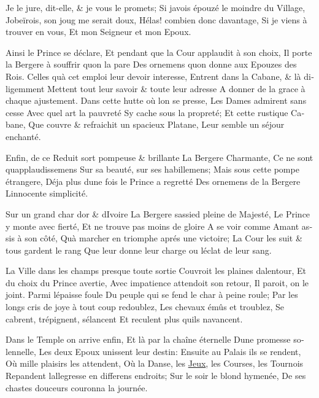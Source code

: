 \documentclass[14pt,a4paper]{memoir}
\newcommand{\ul}[1]{\uline{#1}}
\begin{document}
\begin{otherlanguage}{french}
{Je le jure, dit-elle, \& je vous le promets; } {Si
j\textquotesingle avois épouzé le moindre du Village,}
{J\textquotesingle obeïrois, son joug me serait doux,} {Hélas! combien
donc davantage,} {Si je viens à trouver en vous,} {Et mon Seigneur et
mon Epoux.}

{Ainsi le Prince se déclare,} {Et pendant que la Cour applaudit à son
choix,} {Il porte la Bergere à souffrir qu\textquotesingle on la pare}
{Des ornemens qu\textquotesingle on donne aux Epouzes des Rois.} {Celles
qu\textquotesingle à cet emploi leur devoir interesse,} {Entrent dans la
Cabane, \& là diligemment} {Mettent tout leur savoir \& toute leur
adresse } {A donner de la grace à chaque ajustement.} {Dans cette hutte
où l\textquotesingle on se presse,} {Les Dames admirent sans cesse}
{Avec quel art la pauvreté} {S\textquotesingle y cache sous la
propreté;} {Et cette rustique Cabane,} {Que couvre \& refraichit un
spacieux Platane, } {Leur semble un séjour enchanté.}

{Enfin, de ce Reduit sort pompeuse \& brillante } {La Bergere
Charmante,} {Ce ne sont qu\textquotesingle applaudissemens} {Sur sa
beauté, sur ses habillemens;} {Mais sous cette pompe étrangere,} {Déja
plus d\textquotesingle une fois le Prince a regretté} {Des ornemens de
la Bergere} {L\textquotesingle innocente simplicité.}

{Sur un grand char d\textquotesingle or \& d\textquotesingle Ivoire} {La
Bergere s\textquotesingle assied pleine de Majesté,} {Le Prince y monte
avec fierté,} {Et ne trouve pas moins de gloire} {A se voir comme Amant
assis à son côté,} {Qu\textquotesingle à marcher en triomphe aprés une
victoire;} {La Cour les suit \& tous gardent le rang} {Que leur donne
leur charge ou l\textquotesingle éclat de leur sang.}

{La Ville dans les champs presque toute sortie} {Couvroit les plaines
d\textquotesingle alentour,} {Et du choix du Prince avertie,} {Avec
impatience attendoit son retour,} {Il paroit, on le joint. Parmi
l\textquotesingle épaisse foule} {Du peuple qui se fend le char à peine
roule;} {Par les longs cris de joye à tout coup redoublez, } {Les
chevaux émûs et troublez,} {Se cabrent, trépignent,
s\textquotesingle élancent} {Et reculent plus qu\textquotesingle ils
n\textquotesingle avancent.}

{Dans le Temple on arrive enfin,} {Et là par la chaîne éternelle}
{D\textquotesingle une promesse solennelle,} {Les deux Epoux unissent
leur destin:} {Ensuite au Palais ils se rendent,} {Où mille plaisirs les
attendent,} {Où la Danse, les \ul{Jeux}, les Courses, les Tournois}
{Repandent l\textquotesingle allegresse en differens endroits;} {Sur le
soir le blond hymenée,} {De ses chastes douceurs couronna la journée.}


\end{otherlanguage}
\end{document}
